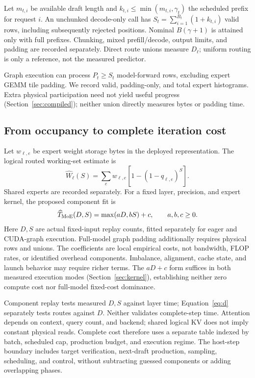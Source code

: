 \documentclass[conference,letterpaper]{IEEEtran}
\begin{document}
Let $m_{t,i}$ be available draft length and $k_{t,i}\leq\min(m_{t,i},\gamma_t)$ the scheduled prefix for request $i$. An unchunked decode-only call has $S_t=\sum_{i=1}^{B_t}(1+k_{t,i})$ valid rows, including subsequently rejected positions. Nominal $B(\gamma+1)$ is attained only with full prefixes. Chunking, mixed prefill/decode, output limits, and padding are recorded separately. Direct route unions measure $D_\ell$; uniform routing is only a reference, not the measured predictor.

Graph execution can process $P_t\geq S_t$ model-forward rows, excluding expert GEMM tile padding. We record valid, padding-only, and total expert histograms. Extra physical participation need not yield useful progress (Section~\ref{sec:compiled}); neither union directly measures bytes or padding time.

\subsection{From occupancy to complete iteration cost}
Let $w_{\ell,e}$ be expert weight storage bytes in the deployed representation. The logical routed working-set estimate is
\begin{equation}
\widehat W_\ell(S)=\sum_e w_{\ell,e}[1-(1-q_{\ell,e})^S].
\end{equation}
Shared experts are recorded separately. For a fixed layer, precision, and expert kernel, the proposed component fit is
\begin{equation}\label{eq:time}
\widehat T_{\rm MoE}(D,S)=\max(aD,bS)+c,\qquad a,b,c\geq0.
\end{equation}
Here $D,S$ are actual fixed-input replay counts, fitted separately for eager and CUDA-graph execution. Full-model graph padding additionally requires physical rows and unions. The coefficients are local empirical costs, not bandwidth, FLOP rates, or identified overhead components. Imbalance, alignment, cache state, and launch behavior may require richer terms. The $aD+c$ form suffices in both measured execution modes (Section~\ref{sec:kernel}), establishing neither zero compute cost nor full-model fixed-cost dominance.

Component replay tests measured $D,S$ against layer time; Equation~\ref{eq:d} separately tests routes against $D$. Neither validates complete-step time. Attention depends on context, query count, and backend; shared logical KV does not imply constant physical reads. Complete cost therefore uses a separate table indexed by batch, scheduled cap, production budget, and execution regime. The host-step boundary includes target verification, next-draft production, sampling, scheduling, and control, without subtracting guessed components or adding overlapping phases.
\end{document}
